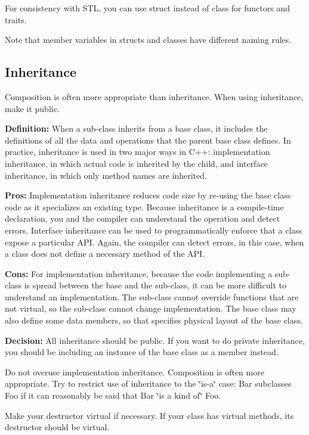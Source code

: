 For consistency with S\+TL, you can use struct instead of class for functors and traits.

Note that member variables in structs and classes have different naming rules.

\subsection*{Inheritance}

Composition is often more appropriate than inheritance. When using inheritance, make it public.

{\bfseries Definition\+:} When a sub-\/class inherits from a base class, it includes the definitions of all the data and operations that the parent base class defines. In practice, inheritance is used in two major ways in C++\+: implementation inheritance, in which actual code is inherited by the child, and interface inheritance, in which only method names are inherited.

{\bfseries Pros\+:} Implementation inheritance reduces code size by re-\/using the base class code as it specializes an existing type. Because inheritance is a compile-\/time declaration, you and the compiler can understand the operation and detect errors. Interface inheritance can be used to programmatically enforce that a class expose a particular A\+PI. Again, the compiler can detect errors, in this case, when a class does not define a necessary method of the A\+PI.

{\bfseries Cons\+:} For implementation inheritance, because the code implementing a sub-\/class is spread between the base and the sub-\/class, it can be more difficult to understand an implementation. The sub-\/class cannot override functions that are not virtual, so the sub-\/class cannot change implementation. The base class may also define some data members, so that specifies physical layout of the base class.

{\bfseries Decision\+:} All inheritance should be public. If you want to do private inheritance, you should be including an instance of the base class as a member instead.

Do not overuse implementation inheritance. Composition is often more appropriate. Try to restrict use of inheritance to the \char`\"{}is-\/a\char`\"{} case\+: Bar subclasses Foo if it can reasonably be said that Bar \char`\"{}is a kind of\char`\"{} Foo.

Make your destructor virtual if necessary. If your class has virtual methods, its destructor should be virtual.

